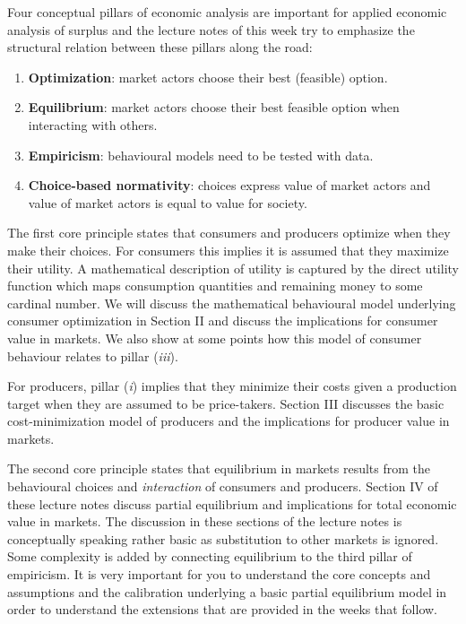 \documentclass[
]{book}
\providecommand{\tightlist}{%
  \setlength{\itemsep}{0pt}\setlength{\parskip}{0pt}}
\begin{document}
Four conceptual pillars of economic analysis are important for applied economic analysis of surplus and the lecture notes of this week try to emphasize the structural relation between these pillars along the road:

\begin{enumerate}
\def\labelenumi{\arabic{enumi}.}
\tightlist
\item
  \textbf{Optimization}: market actors choose their best (feasible) option.
\item
  \textbf{Equilibrium}: market actors choose their best feasible option when interacting with others.
\item
  \textbf{Empiricism}: behavioural models need to be tested with data.
\item
  \textbf{Choice-based normativity}: choices express value of market actors and value of market actors is equal to value for society.
\end{enumerate}

The first core principle states that consumers and producers optimize when they make their choices. For consumers this implies it is assumed that they maximize their utility. A mathematical description of utility is captured by the direct utility function which maps consumption quantities and remaining money to some cardinal number. We will discuss the mathematical behavioural model underlying consumer optimization in Section II and discuss the implications for consumer value in markets. We also show at some points how this model of consumer behaviour relates to pillar (\emph{iii}).

For producers, pillar (\emph{i}) implies that they minimize their costs given a production target when they are assumed to be price-takers. Section III discusses the basic cost-minimization model of producers and the implications for producer value in markets.

The second core principle states that equilibrium in markets results from the behavioural choices and \emph{interaction} of consumers and producers. Section IV of these lecture notes discuss partial equilibrium and implications for total economic value in markets. The discussion in these sections of the lecture notes is conceptually speaking rather basic as substitution to other markets is ignored. Some complexity is added by connecting equilibrium to the third pillar of empiricism. It is very important for you to understand the core concepts and assumptions and the calibration underlying a basic partial equilibrium model in order to understand the extensions that are provided in the weeks that follow.
\end{document}
